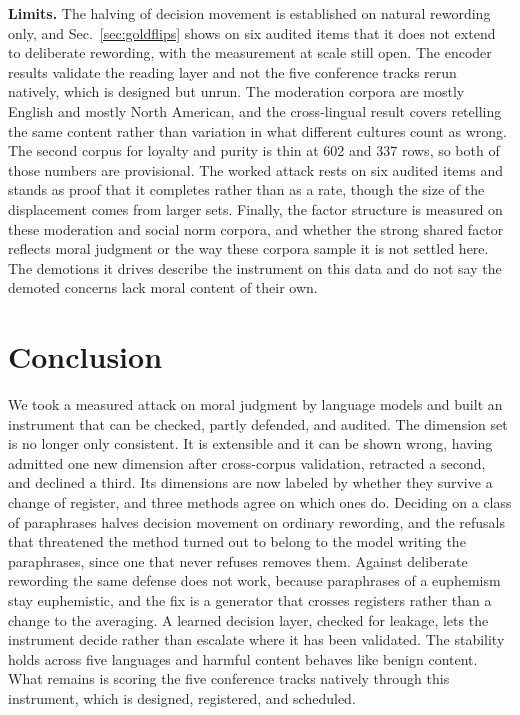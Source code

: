 \documentclass[journal]{IEEEtran}
\begin{document}
\textbf{Limits.} The halving of decision movement is established on natural
rewording only, and Sec.~\ref{sec:goldflips} shows on six audited items that
it does not extend to deliberate rewording, with the measurement at scale
still open. The encoder results validate the reading layer and not the five
conference tracks rerun natively, which is designed but unrun. The moderation
corpora are mostly English and mostly North American, and the cross-lingual
result covers retelling the same content rather than variation in what
different cultures count as wrong. The second corpus for loyalty and purity
is thin at 602 and 337 rows, so both of those numbers are provisional. The
worked attack rests on six audited items and stands as proof that it
completes rather than as a rate, though the size of the displacement comes
from larger sets. Finally, the factor structure is measured on these
moderation and social norm corpora, and whether the strong shared factor
reflects moral judgment or the way these corpora sample it is not settled
here. The demotions it drives describe the instrument on this data and do not
say the demoted concerns lack moral content of their own.

\section{Conclusion}
\label{sec:conclusion}

We took a measured attack on moral judgment by language models and built an
instrument that can be checked, partly defended, and audited. The dimension
set is no longer only consistent. It is extensible and it can be shown wrong,
having admitted one new dimension after cross-corpus validation, retracted a
second, and declined a third. Its dimensions are now labeled by whether they
survive a change of register, and three methods agree on which ones do.
Deciding on a class of paraphrases halves decision movement on ordinary
rewording, and the refusals that threatened the method turned out to belong
to the model writing the paraphrases, since one that never refuses removes
them. Against deliberate rewording the same defense does not work, because
paraphrases of a euphemism stay euphemistic, and the fix is a generator that
crosses registers rather than a change to the averaging. A learned decision
layer, checked for leakage, lets the instrument decide rather than escalate
where it has been validated. The stability holds across five languages and
harmful content behaves like benign content. What remains is scoring the five
conference tracks natively through this instrument, which is designed,
registered, and scheduled.
\end{document}
